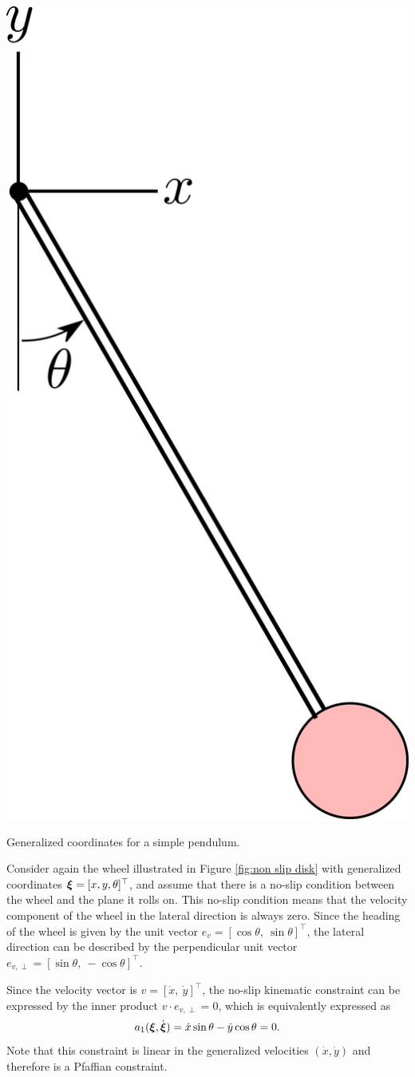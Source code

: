 \begin{marginfigure}
    \centering 
    \includegraphics[width=0.55\linewidth]{figs/ch01_figs/pendulum.png}
    \caption{Generalized coordinates for a simple pendulum. } 
    \label{fig:pendulum} 
\end{marginfigure} 



\begin{example} \label{ex:noslipwheel}
\theoremstyle{definition}
Consider again the wheel illustrated in Figure \ref{fig:non slip disk} with generalized coordinates $\bm{\xi} = [x, y, \theta]^\top $, and assume that there is a no-slip condition between the wheel and the plane it rolls on. This no-slip condition means that the velocity component of the wheel in the lateral direction is always zero. Since the heading of the wheel is given by the unit vector $e_v = [\cos\theta, \:\sin\theta]^\top $, the lateral direction can be described by the perpendicular unit vector $e_{v,\perp} = [\sin\theta, \: -\cos\theta]^\top $. 

Since the velocity vector is $v = [\dot{x}, \: \dot{y}]^\top $, the no-slip kinematic constraint can be expressed by the inner product $v \cdot e_{v,\perp} = 0$, which is equivalently expressed as
\begin{equation} \label{eq:wheelnonholonomic}
a_1(\bm{\xi},\dot{\bm{\xi}}) = \dot{x} \sin\theta - \dot{y} \cos \theta = 0.
\end{equation}
Note that this constraint is linear in the generalized velocities $(\dot{x}, \dot{y})$ and therefore is a Pfaffian constraint.
\end{example}



